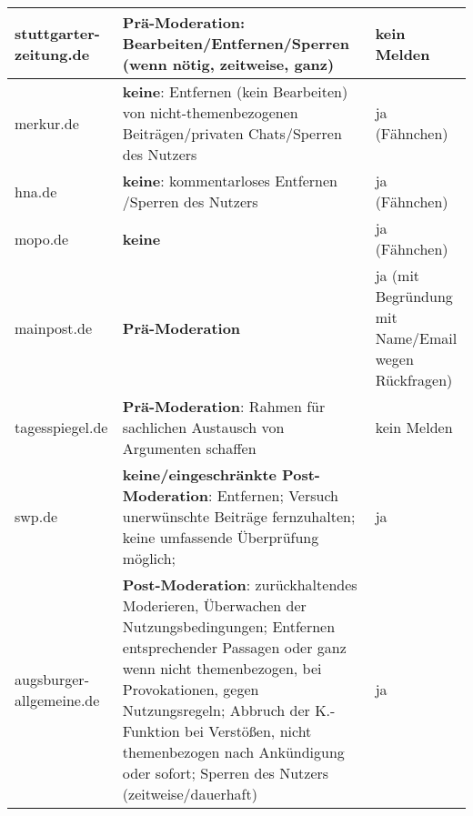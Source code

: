 \begin{landscape}
\begin{longtable}{l|p{110mm}p{50mm}}
stuttgarter-zeitung.de &
  {\bf Prä-Moderation}: Bearbeiten/Entfernen/Sperren (wenn nötig, zeitweise, ganz) &
  kein Melden\\\hline

merkur.de &
   {\bf keine}: Entfernen (kein Bearbeiten) von nicht-themenbezogenen
  Beiträgen/privaten Chats/Sperren des Nutzers &
  ja (Fähnchen) \\\hline

hna.de &
   {\bf keine}: kommentarloses Entfernen /Sperren des Nutzers &
  ja (Fähnchen) \\\hline

mopo.de &
   {\bf keine} & 
  ja (Fähnchen) \\\hline

mainpost.de &
   {\bf Prä-Moderation} &
  ja (mit Begründung mit Name/Email wegen Rückfragen) \\\hline

tagesspiegel.de &
   {\bf Prä-Moderation}: Rahmen für sachlichen Austausch von Argumenten schaffen &
  kein Melden \\\hline

swp.de &
   {\bf keine/eingeschränkte Post-Moderation}: Entfernen; Versuch unerwünschte
  Beiträge fernzuhalten; keine umfassende Überprüfung möglich; &
  ja \\\hline

augsburger-allgemeine.de &
   {\bf Post-Moderation}: zurückhaltendes Moderieren, Überwachen der
  Nutzungsbedingungen; Entfernen entsprechender Passagen oder ganz wenn nicht
  themenbezogen, bei Provokationen, gegen Nutzungsregeln; Abbruch der
  K.-Funktion bei Verstößen, nicht themenbezogen nach Ankündigung oder sofort;
  Sperren  des Nutzers (zeitweise/dauerhaft) &
  ja \\

\end{longtable}
\end{landscape}


